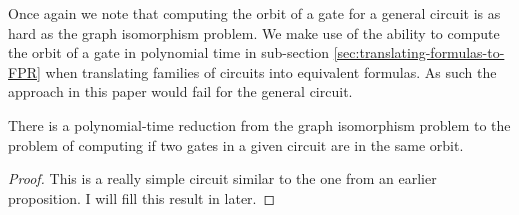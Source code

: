 \documentclass[../paper.tex]{subfiles}
\begin{document}
Once again we note that computing the orbit of a gate for a general circuit is
as hard as the graph isomorphism problem. We make use of the ability to compute
the orbit of a gate in polynomial time in sub-section
\ref{sec:translating-formulas-to-FPR} when translating families of circuits into
equivalent formulas. As such the approach in this paper would fail for the
general circuit.

\begin{prop}
  There is a polynomial-time reduction from the graph isomorphism problem to the
  problem of computing if two gates in a given circuit are in the same orbit.
\end{prop}
\begin{proof}
  This is a really simple circuit similar to the one from an earlier
  proposition. I will fill this result in later.
\end{proof}





  
\end{document}
